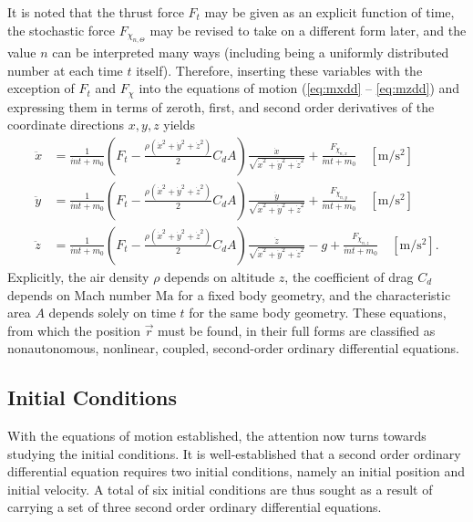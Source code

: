\documentclass[11pt]{thesis}
\numberwithin{equation}{section}
\begin{document}
It is noted that the thrust force $F_t$ may be given as an explicit function of time, the stochastic force $F_{\chi_{n,\Theta}}$ may be revised to take on a different form later, and the value $n$ can be interpreted many ways (including being a uniformly distributed number at each time $t$ itself). Therefore, inserting these variables with the exception of $F_t$ and $F_{\chi}$ into the equations of motion (\ref{eq:mxdd} -- \ref{eq:mzdd}) and expressing them in terms of zeroth, first, and second order derivatives of the coordinate directions $x,y,z$ yields
\begin{align}
\ddot{x} &= \frac{1}{\dot{m} t + m_0} \left(F_t - \frac{\rho (\dot{x}^2 + \dot{y}^2 + \dot{z}^2)}{2} C_d A\right) \frac{\dot{x}}{\sqrt{\dot{x}^2 + \dot{y}^2 + \dot{z}^2}} + \frac{F_{\chi_{n,x}}}{\dot{m}t + m_0} \quad [\si{\m/\s\squared}] \label{eq:accelx} \\
\ddot{y} &= \frac{1}{\dot{m} t + m_0} \left(F_t - \frac{\rho (\dot{x}^2 + \dot{y}^2 + \dot{z}^2)}{2} C_d A\right) \frac{\dot{y}}{\sqrt{\dot{x}^2 + \dot{y}^2 + \dot{z}^2}} + \frac{F_{\chi_{n,y}}}{\dot{m}t + m_0} \quad [\si{\m/\s\squared}] \label{eq:accely} \\
\ddot{z} &= \frac{1}{\dot{m} t + m_0} \left(F_t - \frac{\rho (\dot{x}^2 + \dot{y}^2 + \dot{z}^2)}{2} C_d A\right) \frac{\dot{z}}{\sqrt{\dot{x}^2 + \dot{y}^2 + \dot{z}^2}} - g + \frac{F_{\chi_{n,z}}}{\dot{m}t + m_0} \quad [\si{\m/\s\squared}].  \label{eq:accelz} 
\end{align}
Explicitly, the air density $\rho$ depends on altitude $z$, the coefficient of drag $C_d$ depends on Mach number $\mathrm{Ma}$ for a fixed body geometry, and the characteristic area $A$ depends solely on time $t$ for the same body geometry. These equations, from which the position $\vec{r}$ must be found, in their full forms are classified as nonautonomous, nonlinear, coupled, second-order ordinary differential equations.
\subsection{Initial Conditions}
With the equations of motion established, the attention now turns towards studying the initial conditions. It is well-established that a second order ordinary differential equation requires two initial conditions, namely an initial position and initial velocity. A total of six initial conditions are thus sought as a result of carrying a set of three second order ordinary differential equations.
\end{document}
